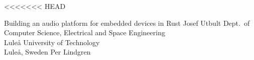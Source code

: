 \documentclass[12pt,a4paper,openright,final,twoside]{LTU-Report-Theme/cseethesis}
\begin{document}




<<<<<<< HEAD

\def\thesistitle{Building an audio platform for embedded devices in Rust}

\def\theauthor{Josef Utbult}
\def\theaddress{Dept.\ of Computer Science, Electrical and Space Engineering\\
Luleå University of Technology\\ Luleå, Sweden}

\def\supervisors{Per Lindgren}

\def\supervisorstring{Supervisor:} 

\def\dedication{}

\def\theabstract{}
\def\thepreface{}

\createpreamble
  {\thesistitle}
  {\theauthor}
  {\theaddress}
  {\supervisors}
  {\dedication}
  {\theabstract}
  {\thepreface}

\startchapters
\begin{bibunit}[IEEEtran]

	
	

	\makebib

\end{bibunit}
\end{document}
